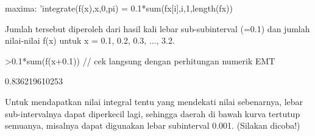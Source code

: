 \documentclass{article}
\begin{document}
\begin{eulernotebook}
\begin{eulercomment}
\begin{eulercomment}
\begin{eulercomment}
maxima: 'integrate(f(x),x,0,pi) = 0.1*sum(fx[i],i,1,length(fx))

Jumlah tersebut diperoleh dari hasil kali lebar sub-subinterval (=0.1)
dan jumlah nilai-nilai f(x) untuk x = 0.1, 0.2, 0.3, ..., 3.2.
\end{eulercomment}
\begin{eulerprompt}
>0.1*sum(f(x+0.1)) // cek langsung dengan perhitungan numerik EMT
\end{eulerprompt}
\begin{euleroutput}
  0.836219610253
\end{euleroutput}
\begin{eulercomment}
Untuk mendapatkan nilai integral tentu yang mendekati nilai sebenarnya, lebar
sub-intervalnya dapat diperkecil lagi, sehingga daerah di bawah kurva tertutup
semuanya, misalnya dapat digunakan lebar subinterval 0.001. (Silakan dicoba!)


\end{eulercomment}
\end{eulercomment}
\end{eulercomment}
\end{eulernotebook}
\end{document}
